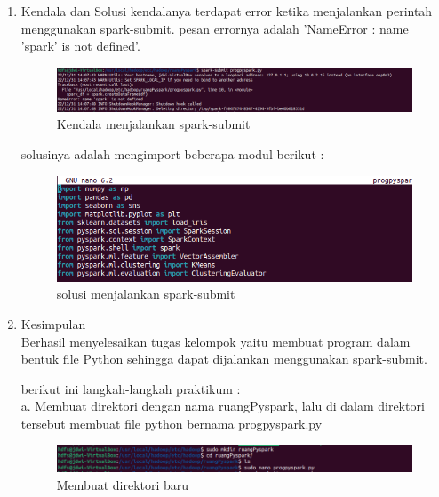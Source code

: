 \begin{enumerate}
\item Kendala dan Solusi
\newline kendalanya terdapat error ketika menjalankan perintah menggunakan spark-submit. pesan errornya adalah 'NameError : name 'spark' is not defined'.
\begin{figure}[!ht]
\includegraphics[width=\textwidth]{TugasKelompok/Kelompok1/kendala}
\caption{Kendala menjalankan spark-submit}
\label{gam:kendala}
\end{figure} 
\newpage
solusinya adalah mengimport beberapa modul berikut :
\begin{figure}[!ht]
\includegraphics[width=\textwidth]{TugasKelompok/Kelompok1/solusi}
\caption{solusi menjalankan spark-submit}
\label{gam:solusi}
\end{figure} 

\item Kesimpulan \\
Berhasil menyelesaikan tugas kelompok yaitu membuat program dalam bentuk file Python sehingga
dapat dijalankan menggunakan spark-submit.

berikut ini langkah-langkah praktikum :\\
a. Membuat direktori dengan nama ruangPyspark, lalu di dalam direktori tersebut membuat file python bernama progpyspark.py
\begin{figure}[!ht]
\includegraphics[width=\textwidth]{TugasKelompok/Kelompok1/membuat-direktori}
\caption{Membuat direktori baru}
\label{gam:membuat-direktori}
\end{figure} 



\end{enumerate}
